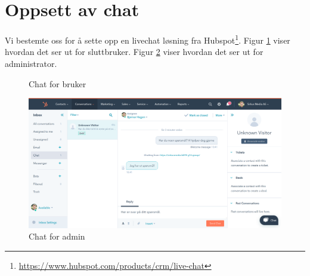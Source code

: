\section{Oppsett av chat}
Vi bestemte oss for å sette opp en livechat løsning fra Hubspot\footnote{\url{https://www.hubspot.com/products/crm/live-chat}}. Figur \ref{fig:chat-user} viser hvordan det ser ut for sluttbruker. Figur \ref{fig:chat-admin} viser hvordan det ser ut for administrator.
\begin{figure}[H]
    \begin{center}
        \label{fig:chat-user}
        \caption{Chat for bruker}
    \end{center}
\end{figure}
\begin{figure}[H]
    \centering
    \includegraphics[width=\textwidth]{bjornar/chat-admin.png}
    \caption{Chat for admin}
    \label{fig:chat-admin}
\end{figure}

